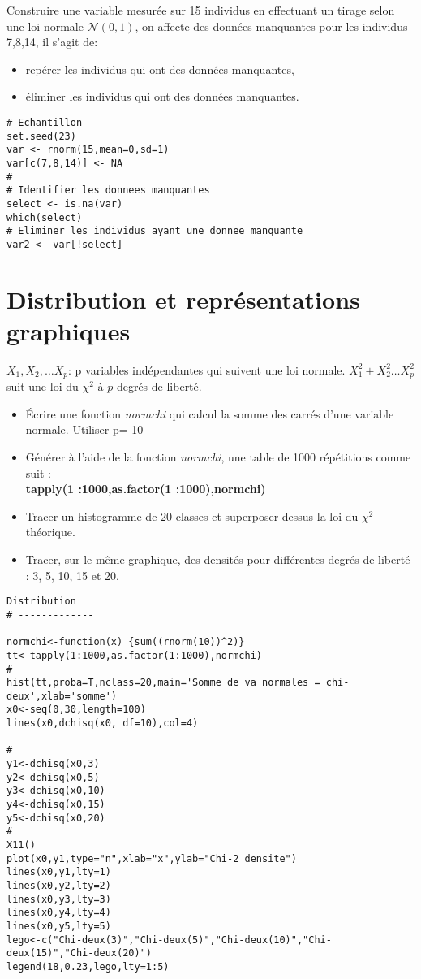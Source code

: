 \documentclass[12pt,twoside,openright]{article}
\begin{document}
Construire une variable mesurée sur 15 individus en effectuant un tirage selon une loi normale $ \mathcal N(0,1)$, on affecte des données manquantes pour les individus 7,8,14, il s'agit de:
\begin{itemize}
\item repérer les individus qui ont des données manquantes,
\item éliminer les individus  qui ont des données manquantes.
\end{itemize}
%
\begin{verbatim}
# Echantillon
set.seed(23)
var <- rnorm(15,mean=0,sd=1)
var[c(7,8,14)] <- NA
#
# Identifier les donnees manquantes
select <- is.na(var)
which(select)
# Eliminer les individus ayant une donnee manquante
var2 <- var[!select]
\end{verbatim}

\section{Distribution et représentations graphiques}
$X_1,X_2,\ldots X_p$: p variables indépendantes qui suivent une loi normale. $X_1^2 + X_2^2\ldots X_p^2$ suit une loi du $\chi^2$ à $p$ degrés de liberté.

\begin{itemize}
\item  Écrire une fonction \emph{normchi} qui calcul la somme des carrés d’une variable normale. Utiliser
p= 10
\item Générer à l’aide de la fonction \emph{normchi}, une table de 1000 répétitions comme suit :\\

{\bf tapply(1 :1000,as.factor(1 :1000),normchi)}

\item Tracer un histogramme de 20 classes et superposer dessus la loi du $\chi^2$ théorique.
\item Tracer, sur le même graphique, des densités pour différentes degrés de liberté : 3, 5, 10, 15 et 20.
\end{itemize}

\begin{verbatim}
Distribution
# -------------

normchi<-function(x) {sum((rnorm(10))^2)}
tt<-tapply(1:1000,as.factor(1:1000),normchi)
#
hist(tt,proba=T,nclass=20,main='Somme de va normales = chi-deux',xlab='somme')
x0<-seq(0,30,length=100)
lines(x0,dchisq(x0, df=10),col=4)

#
y1<-dchisq(x0,3)
y2<-dchisq(x0,5)
y3<-dchisq(x0,10)
y4<-dchisq(x0,15)
y5<-dchisq(x0,20)
#
X11()
plot(x0,y1,type="n",xlab="x",ylab="Chi-2 densite")
lines(x0,y1,lty=1)
lines(x0,y2,lty=2)
lines(x0,y3,lty=3)
lines(x0,y4,lty=4)
lines(x0,y5,lty=5)
lego<-c("Chi-deux(3)","Chi-deux(5)","Chi-deux(10)","Chi-deux(15)","Chi-deux(20)")
legend(18,0.23,lego,lty=1:5)
\end{verbatim}
\end{document}
